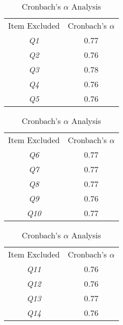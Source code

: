 
\begin{table}[!htbp]
\caption{Cronbach's $\alpha$ Analysis}
\begin{subtable}[!htbp]{0.45\textwidth}
\flushright
\begin{tabular}[!htbp]{c c}
\toprule
Item Excluded & Cronbach's $\alpha$ \\
\textit{Q1} & 0.77 \\
\textit{Q2} & 0.76 \\
\textit{Q3} & 0.78 \\
\textit{Q4} & 0.76 \\
\textit{Q5} & 0.76 \\
\end{tabular}
\label{tab:table2_a}
\end{subtable}
\hspace{\fill}
\begin{subtable}[!htbp]{0.45\textwidth}
\flushright
\begin{tabular}[!htbp]{c c}
\toprule
Item Excluded & Cronbach's $\alpha$ \\
\textit{Q6} & 0.77 \\
\textit{Q7} & 0.77 \\
\textit{Q8} & 0.77 \\
\textit{Q9} & 0.76 \\
\textit{Q10} & 0.77 \\
\end{tabular}
\label{tab:table2_b}
\end{subtable}
\hspace{\fill}
\begin{subtable}[!htbp]{0.45\textwidth}
\flushright
\begin{tabular}[!htbp]{c c}
\toprule
Item Excluded & Cronbach's $\alpha$ \\
\textit{Q11} & 0.76 \\
\textit{Q12} & 0.76 \\
\textit{Q13} & 0.77 \\
\textit{Q14} & 0.76 \\

\end{tabular}
\end{subtable}
\end{table}

